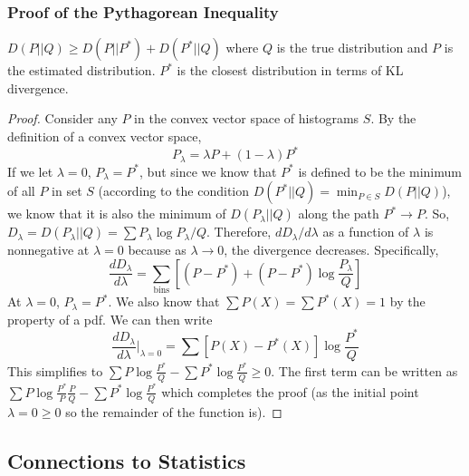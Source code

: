 \documentclass[11pt]{article}
\theoremstyle{definition}
\begin{document}
\subsubsection{Proof of the Pythagorean Inequality} 
 $D(P||Q) \geq D(P || P^*) + D(P^* || Q)$ where $Q$ is the true distribution and $P$ is the estimated distribution. $P^*$ is the closest distribution in terms of KL divergence.
\begin{proof}
Consider any $P$ in the convex vector space of histograms $S$. By the definition of a convex vector space, $$P_\lambda = \lambda P + (1 - \lambda) P^*$$If we let $\lambda = 0$, $P_\lambda = P^*$, but since we know that $P^*$ is defined to be the minimum of all $P$ in set $S$ (according to the condition $D(P^* || Q) = \min_{P \in S} D(P || Q)$), we know that it is also the minimum of $D(P_\lambda || Q)$ along the path $P^* \rightarrow P$. So, $D_\lambda = D(P_\lambda || Q) = \sum P_\lambda \log P_\lambda / Q$. Therefore, $d D_\lambda / d \lambda$ as a function of $\lambda$ is nonnegative at $\lambda = 0$ because as $\lambda \rightarrow 0$, the divergence decreases. Specifically, $$\frac{d D_\lambda}{d \lambda} = \sum_{\text{bins}} \left[ (P - P^*) + (P - P^*) \log \frac{P_\lambda}{Q} \right]$$At $\lambda = 0$, $P_\lambda = P^*$. We also know that $\sum P(X) = \sum P^*(X) = 1$ by the property of a pdf. We can then write $$\frac{d D_\lambda}{d \lambda} \bigg|_{\lambda = 0} = \sum \left[ P(X) - P^*(X) \right] \log \frac{P^*}{Q}$$This simplifies to $\sum P \log \frac{P^*}{Q} - \sum P^* \log \frac{P^*}{Q} \geq 0$. The first term can be written as $\sum P \log \frac{P^*}{P} \frac{P}{Q} - \sum P^* \log \frac{P^*}{Q}$ which completes the proof (as the initial point $\lambda = 0 \geq 0$ so the remainder of the function is).
\end{proof} 

\subsection{Connections to Statistics}
\end{document}
